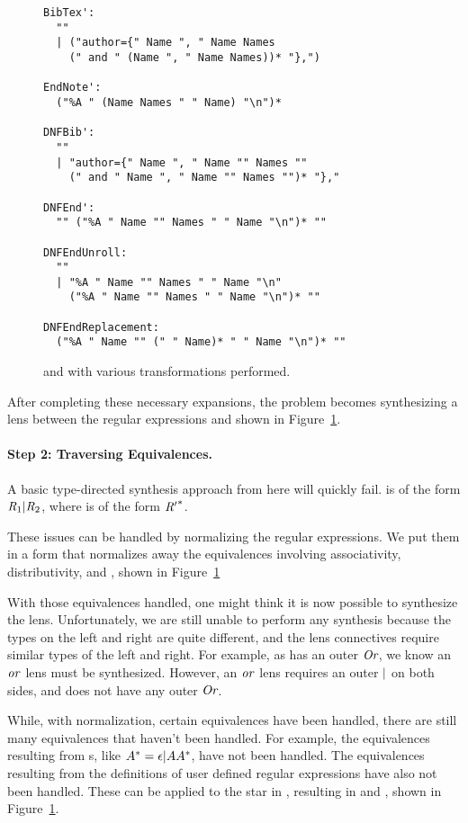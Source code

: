 \documentclass[numbers,10pt,preprint\ifanon ,nocopyrightspace\fi]{sigplanconf}
\begin{document}
\begin{figure}
\begin{lstlisting}
BibTex':
  "" 
  | ("author={" Name ", " Name Names
    (" and " (Name ", " Name Names))* "},")

EndNote':
  ("%A " (Name Names " " Name) "\n")*

DNFBib':
  ""
  | "author={" Name ", " Name "" Names ""
    (" and " Name ", " Name "" Names "")* "},"

DNFEnd':
  "" ("%A " Name "" Names " " Name "\n")* ""

DNFEndUnroll:
  ""
  | "%A " Name "" Names " " Name "\n"
    ("%A " Name "" Names " " Name "\n")* ""

DNFEndReplacement:
  ("%A " Name "" (" " Name)* " " Name "\n")* ""
\end{lstlisting}
  \label{fig:examples-expanded}
  \caption{
     and  with various transformations performed.
  }
\end{figure}
After completing these necessary expansions, the problem becomes synthesizing a
lens between the regular expressions  and  shown in
Figure~\ref{fig:examples-expanded}.

\paragraph*{Step 2:  Traversing Equivalences.}

A basic type-directed synthesis approach from here will quickly fail.
 is of the form $\mathit{R}_1|\mathit{R}_2$, where  is of the form
${\mathit{R}'}^*$.

These issues can be handled by normalizing the regular expressions.
We put them in a form that normalizes away the equivalences involving
associativity, distributivity, and \EmptyString{}, shown in
Figure~\ref{fig:examples-expanded}

With those equivalences handled, one might think it is now possible to
synthesize the lens.
Unfortunately, we are still unable to perform any synthesis because the types
on the left and right are quite different, and the lens connectives require
similar types of the left and right.
For example, as  has an outer $\textit{Or}$, we know an $\mathit{or}$ lens must be
synthesized.
However, an $\mathit{or}$ lens requires an outer $|$ on both sides, and  does
not have any outer $\textit{Or}$.

While, with normalization, certain equivalences have been handled, there are
still many equivalences that haven't been handled.
For example, the equivalences resulting from \StarRegexType{}s, like
${A}^*=\epsilon | A{A}^*$, have not been handled.
The equivalences resulting from the definitions of user defined regular
expressions have also not been handled. These can be applied to the star in
, resulting in  and , shown in
Figure~\ref{fig:examples-expanded}.
\end{document}
